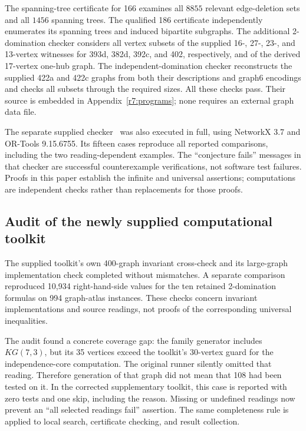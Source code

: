 \documentclass[11pt,a4paper]{article}
\theoremstyle{remark}
\begin{document}
The spanning-tree certificate for 166 examines all $8855$ relevant
edge-deletion sets and all $1456$ spanning trees. The qualified 186
certificate independently enumerates its spanning trees and induced
bipartite subgraphs. The additional 2-domination checker considers all
vertex subsets of the supplied 16-, 27-, 23-, and 13-vertex witnesses
for 393d, 382d, 392c, and 402, respectively, and of the derived
17-vertex one-hub graph. The independent-domination checker reconstructs
the supplied 422a and 422c graphs from both their descriptions and
graph6 encodings and checks all subsets through the required sizes.
All these checks pass. Their source is embedded in
Appendix~\ref{r7:programs}; none requires an external graph data file.

The separate supplied checker~\cite{UserCode} was also executed in full,
using NetworkX 3.7 and OR-Tools 9.15.6755. Its fifteen cases reproduce
all reported comparisons, including the two reading-dependent examples.
The ``conjecture fails'' messages in that checker are successful
counterexample verifications, not software test failures. Proofs in this
paper establish the infinite and universal assertions; computations are
independent checks rather than replacements for those proofs.



\subsection{Audit of the newly supplied computational toolkit}
The supplied toolkit's own 400-graph invariant cross-check and its
large-graph implementation check completed without mismatches.
A separate comparison reproduced 10,934 right-hand-side values for
the ten retained 2-domination formulas on 994 graph-atlas instances.
These checks concern invariant implementations and source readings,
not proofs of the corresponding universal inequalities.

The audit found a concrete coverage gap: the family generator includes
$KG(7,3)$, but its 35 vertices exceed the toolkit's 30-vertex guard
for the independence-core computation. The original runner silently
omitted that reading. Therefore generation of that graph did not mean
that 108 had been tested on it. In the corrected supplementary toolkit,
this case is reported with zero tests and one skip, including the reason.
Missing or undefined readings now prevent an ``all selected readings
fail'' assertion. The same completeness rule is applied to local
search, certificate checking, and result collection.
\end{document}
